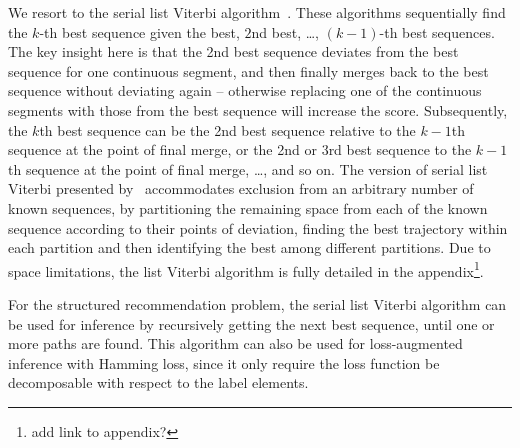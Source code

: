 We resort to the serial list Viterbi algorithm~\cite{seshadri1994list}. 
These algorithms sequentially find the $k$-th best sequence given the best, $2$nd best, \dots, $(k-1)$-th best sequences. 
The key insight here is that the 2nd best sequence deviates from the best sequence
for one continuous segment, and then finally merges back to the best sequence without deviating again 
-- otherwise replacing one of the continuous segments with those from the best sequence will increase the score. 
Subsequently, the $k$th best sequence can be the 2nd best sequence relative to the $k-1$th sequence 
at the point of final merge, or the 2nd or 3rd best sequence to the $k-1$th sequence at the point of final merge, \ldots, and so on. 
The version of serial list Viterbi presented by~\cite{nilsson2001sequentially} accommodates 
exclusion from an arbitrary number of known sequences, by partitioning the remaining space 
from each of the known sequence according to their points of deviation, 
finding the best trajectory within each partition and then identifying the best among different partitions. 
Due to space limitations, the list Viterbi algorithm is fully detailed in the appendix\footnote{add link to appendix? }. 

For the structured recommendation problem, the serial list Viterbi algorithm can be used for inference 
by recursively getting the next best sequence, until one or more paths are found. 
This algorithm can also be used for loss-augmented inference with Hamming loss, 
since it only require the loss function be decomposable with respect to the label elements. 

